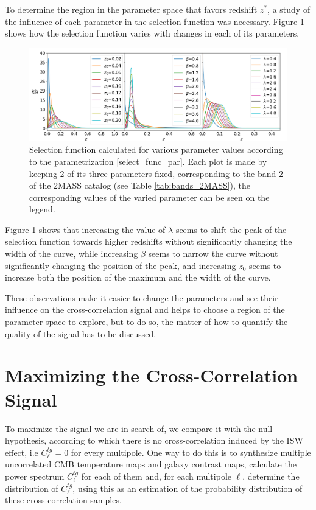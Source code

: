 \documentclass[openany,a4paper,12pt,oneside]{book}
\begin{document}
\begin{spacing}{1.5}
To determine the region in the parameter space that favors redshift $z^*$, a study of the influence of each parameter in the selection function was necessary. Figure \ref{fig:selection_tripleplot} shows how the selection function varies with changes in each of its parameters.

\begin{figure}[!htb]
	\centering
	\includegraphics[width=.98\linewidth]{Imagens/Selection_TriplePlot.png}
	\caption{Selection function calculated for various parameter values according to the parametrization \eqref{select_func_par}. Each plot is made by keeping 2 of its three parameters fixed, corresponding to the band 2 of the 2MASS catalog (see Table \ref{tab:bands_2MASS}), the corresponding values of the varied parameter can be seen on the legend.}
	\label{fig:selection_tripleplot}
\end{figure}

Figure \ref{fig:selection_tripleplot} shows that increasing the value of $\lambda$ seems to shift the peak of the selection function towards higher redshifts without significantly changing the width of the curve, while increasing $\beta$ seems to narrow the curve without significantly changing the position of the peak, and increasing $z_0$ seems to increase both the position of the maximum and the width of the curve. 

These observations make it easier to change the parameters and see their influence on the cross-correlation signal and helps to choose a region of the parameter space to explore, but to do so, the matter of how to quantify the quality of the signal has to be discussed.

\section{Maximizing the Cross-Correlation Signal}

To maximize the signal we are in search of, we compare it with the null hypothesis, according to which there is no cross-correlation induced by the ISW effect, i.e $C^{tg}_\ell=0$ for every multipole. One way to do this is to synthesize multiple uncorrelated CMB temperature maps and galaxy contrast maps, calculate the power spectrum $C^{tg}_\ell$ for each of them and, for each multipole $\ell$, determine the distribution of $C^{tg}_\ell$, using this as an estimation of the probability distribution of these cross-correlation samples.


\end{spacing}
\end{document}
